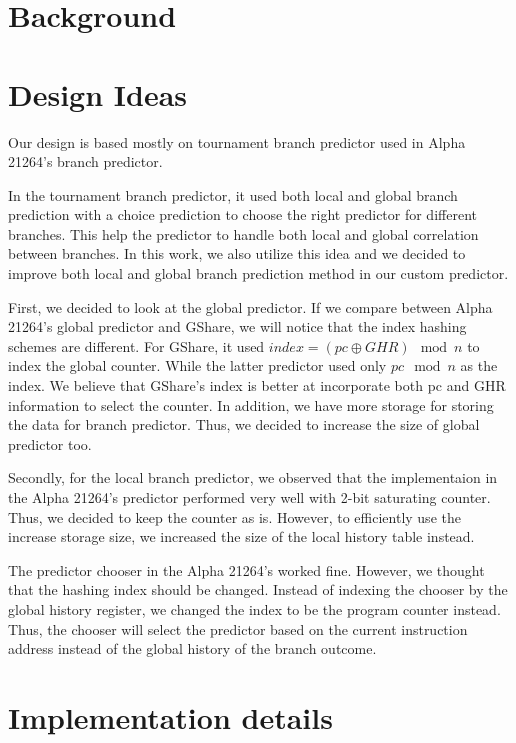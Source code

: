 \documentclass[conference]{IEEEtran}
\begin{document}
\section{Background}

\section{Design Ideas}

Our design is based mostly on tournament branch predictor used in Alpha 21264's branch
predictor.

In the tournament branch predictor, it used both local and global branch prediction
with a choice prediction to choose the right predictor for different branches.
This help the predictor to handle both local and global correlation between branches.
In this work, we also utilize this idea and we decided to improve both local and global
branch prediction method in our custom predictor.

First, we decided to look at the global predictor. If we compare between Alpha 21264's
global predictor and GShare, we will notice that the index hashing schemes are different.
For GShare, it used $index = (pc \oplus GHR) \mod{n}$ to index the global counter. While the latter
predictor used only $pc \mod{n}$ as the index. We believe that GShare's index is better
at incorporate both pc and GHR information to select the counter. In addition, we have more
storage for storing the data for branch predictor. Thus, we decided to increase the size of
global predictor too.

Secondly, for the local branch predictor, we observed that the implementaion in the
Alpha 21264's predictor performed very well with 2-bit saturating counter. Thus, we decided
to keep the counter as is. However, to efficiently use the increase storage size, we increased
the size of the local history table instead.

The predictor chooser in the Alpha 21264's worked fine. However, we thought that the hashing
index should be changed. Instead of indexing the chooser by the global history register,
we changed the index to be the program counter instead. Thus, the chooser will select the
predictor based on the current instruction address instead of the global
history of the branch outcome.

\section{Implementation details}
\end{document}
